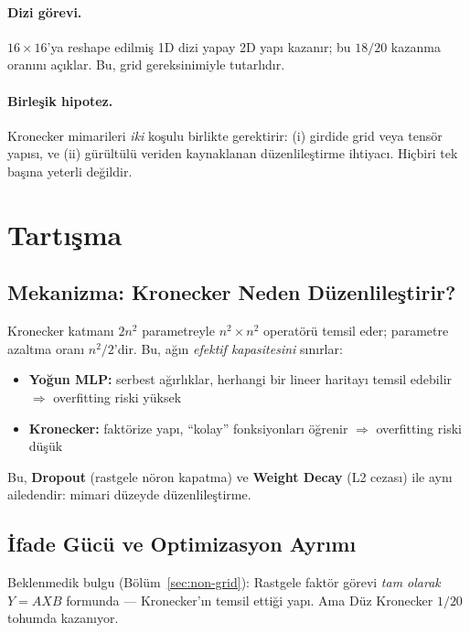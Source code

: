 \documentclass[11pt,a4paper]{article}
\begin{document}
\paragraph{Dizi görevi.}
$16 \times 16$'ya reshape edilmiş 1D dizi yapay 2D yapı kazanır;
bu $18/20$ kazanma oranını açıklar. Bu, grid gereksinimiyle
tutarlıdır.

\paragraph{Birleşik hipotez.}
Kronecker mimarileri \emph{iki} koşulu birlikte gerektirir:
(i) girdide grid veya tensör yapısı, ve (ii) gürültülü veriden
kaynaklanan düzenlileştirme ihtiyacı. Hiçbiri tek başına yeterli
değildir.


\section{Tartışma}
\label{sec:discussion}

\subsection{Mekanizma: Kronecker Neden Düzenlileştirir?}

Kronecker katmanı $2n^2$ parametreyle $n^2 \times n^2$ operatörü
temsil eder; parametre azaltma oranı $n^2/2$'dir. Bu,
ağın \emph{efektif kapasitesini} sınırlar:

\begin{itemize}
\item \textbf{Yoğun MLP:} serbest ağırlıklar, herhangi bir lineer
haritayı temsil edebilir $\Rightarrow$ overfitting riski yüksek
\item \textbf{Kronecker:} faktörize yapı, ``kolay'' fonksiyonları
öğrenir $\Rightarrow$ overfitting riski düşük
\end{itemize}

Bu, \textbf{Dropout} \cite{srivastava2014dropout} (rastgele nöron
kapatma) ve \textbf{Weight Decay} \cite{krogh1991simple} (L2
cezası) ile aynı ailedendir: mimari düzeyde düzenlileştirme.

\subsection{İfade Gücü ve Optimizasyon Ayrımı}

Beklenmedik bulgu (Bölüm~\ref{sec:non-grid}): Rastgele faktör
görevi \emph{tam olarak} $Y = AXB$ formunda --- Kronecker'ın
temsil ettiği yapı. Ama Düz Kronecker $1/20$ tohumda kazanıyor.
\end{document}
